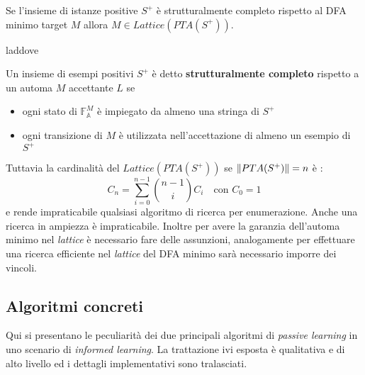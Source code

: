 \begin{teorema}
Se l'insieme di istanze positive $S^{+}$ è strutturalmente completo rispetto al \ac{DFA} minimo target $M$ allora $M \in Lattice(PTA(S^{+}))$. 
\end{teorema}
laddove
\begin{definizione}
\label{def:strcom}
Un insieme di esempi positivi $S^{+}$ è detto \textbf{strutturalmente completo} rispetto a un automa $M$ accettante $L$ se
\begin{itemize}
\item ogni stato di $\mathbb{F}_{\mathbb{A}}^{M}$ è impiegato da almeno una stringa di $S^{+}$
\item ogni transizione di $M$ è utilizzata nell'accettazione di almeno un esempio di $S^{+}$
\end{itemize}
\end{definizione}

Tuttavia la cardinalità del $Lattice(PTA(S^{+}))$ se $\lVert PTA(S^{+})\rVert = n$ è :
\begin{equation*}
C_{n} = \sum_{i=0}^{n-1}\binom{n-1}{i}C_{i}  \quad \text{con } C_{0}=1
\end{equation*}
e rende impraticabile qualsiasi algoritmo di ricerca per enumerazione. Anche una ricerca in ampiezza è impraticabile. Inoltre  per avere la garanzia dell'automa minimo nel \textit{lattice} è necessario fare delle assunzioni, analogamente per effettuare una ricerca efficiente nel \textit{lattice} del \ac{DFA} minimo sarà necessario imporre dei vincoli.

\subsection{Algoritmi concreti} 
 Qui si presentano le peculiarità dei due principali algoritmi di \textit{passive learning} in uno scenario di \textit{informed learning}. La trattazione ivi esposta è qualitativa e di alto livello ed i dettagli implementativi sono tralasciati.
